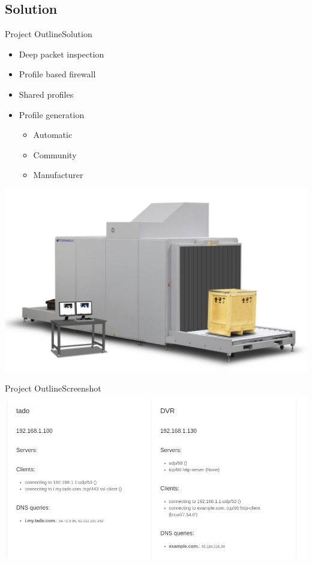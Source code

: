 \subsection{Solution}
\begin{frame}{Project Outline}{Solution}
\begin{minipage}{0.48\textwidth}
\begin{itemize}
	\item Deep packet inspection
	\item Profile based firewall
	\item Shared profiles
	\item Profile generation
	\begin{itemize}
		\item Automatic
		\item Community
		\item Manufacturer
	\end{itemize}

\end{itemize}

\end{minipage}
\hfill
\begin{minipage}{0.48\textwidth}
	\includegraphics[width=1\textwidth]{figs/xray}
	
\end{minipage}



\end{frame}
\begin{frame}{Project Outline}{Screenshot}
\includegraphics[width=1\textwidth]{figs/screenshot.png}
\end{frame}

